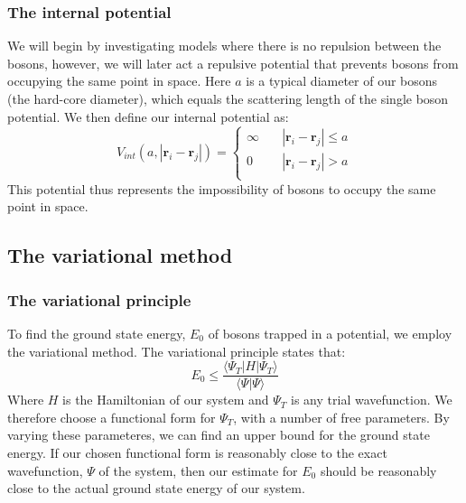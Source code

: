 \documentclass[a4paper, 10pt]{article}
\begin{document}
	\subsubsection{The internal potential}
	We will begin by investigating models where there is no repulsion between the bosons, however, we will later act a repulsive potential that prevents bosons from occupying the same point in space. Here $a$ is a typical diameter of our bosons (the hard-core diameter), which equals the scattering length of the single boson potential. We then define our internal potential as:
	\begin{equation}
	V_{int}(a,|\boldsymbol{r}_i-\boldsymbol{r}_j|)= 
	\begin{cases}
	\infty & \quad |\boldsymbol{r}_i-\boldsymbol{r}_j| \leq  a\\
	0 & \quad |\boldsymbol{r}_i-\boldsymbol{r}_j|>  a\\
	\end{cases}
	\end{equation}
	This potential thus represents the impossibility of bosons to occupy the same point in space.
	\subsection{The variational method}
	\subsubsection{The variational principle}
	To find the ground state energy, $E_0$ of bosons trapped in a potential, we employ the variational method. The variational principle states that:
	\begin{equation}\label{eq:Variational_principle}
	E_0\leq  \frac{\langle \Psi_T |H|\Psi_T \rangle}{\langle \Psi|\Psi\rangle}
	\end{equation}
	Where $H$ is the Hamiltonian of our system and $\Psi_T$ is any trial wavefunction. We therefore choose a functional form for $\Psi_T$, with a number of free parameters. By varying these parameteres, we can find an upper bound for the ground state energy. If our chosen functional form is reasonably close to the exact wavefunction, $\Psi$ of the system, then our estimate for $E_0$ should be reasonably close to the actual ground state energy of our system.
\end{document}
